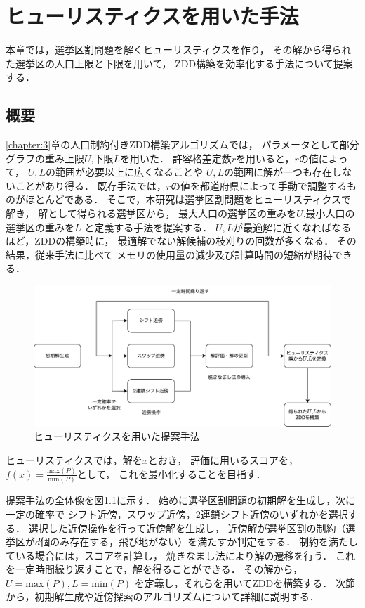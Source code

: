 \chapter{ヒューリスティクスを用いた手法} \label{chapter:4}

本章では，選挙区割問題を解くヒューリスティクスを作り，
その解から得られた選挙区の人口上限と下限を用いて，
ZDD構築を効率化する手法について提案する．

\section{概要}

\ref{chapter:3}章の人口制約付きZDD構築アルゴリズムでは，
パラメータとして部分グラフの重み上限$U$,下限$L$を用いた．
許容格差定数$r$を用いると，$r$の値によって，
$U, L$の範囲が必要以上に広くなることや
$U, L$の範囲に解が一つも存在しないことがあり得る．
既存手法では，$r$の値を都道府県によって手動で調整するものがほとんどである．
そこで，本研究は選挙区割問題をヒューリスティクスで解き，
解として得られる選挙区から，
最大人口の選挙区の重みを$U$,最小人口の選挙区の重みを$L$
と定義する手法を提案する．
$U, L$が最適解に近くなればなるほど，ZDDの構築時に，
最適解でない解候補の枝刈りの回数が多くなる．
その結果，従来手法に比べて
メモリの使用量の減少及び計算時間の短縮が期待できる．

\begin{figure}[htbp]
  \centering
  \includegraphics[scale=0.39]{img/heuristics.png}
  \caption{ヒューリスティクスを用いた提案手法}
  \label{heuristics}
\end{figure}

ヒューリスティクスでは，解を$x$とおき，
評価に用いるスコアを，$f(x)=\frac{\mathrm{max}(P)}{\mathrm{min}(P)}$として，
これを最小化することを目指す．

提案手法の全体像を図\ref{heuristics}に示す．
始めに選挙区割問題の初期解を生成し，次に一定の確率で
シフト近傍，スワップ近傍，2連鎖シフト近傍のいずれかを選択する．
選択した近傍操作を行って近傍解を生成し，
近傍解が選挙区割の制約（選挙区が$d$個のみ存在する，飛び地がない）を満たすか判定をする．
制約を満たしている場合には，スコアを計算し，
焼きなまし法により解の遷移を行う．
これを一定時間繰り返すことで，解を得ることができる．
その解から，$U = \mathrm{max}(P), L = \mathrm{min}(P)$
を定義し，それらを用いてZDDを構築する．
次節から，初期解生成や近傍探索のアルゴリズムについて詳細に説明する．

